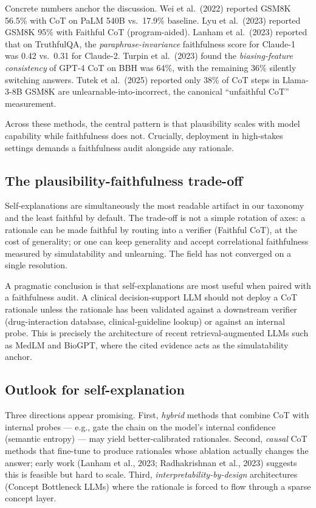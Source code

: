 Concrete numbers anchor the discussion. Wei et al.~(2022) reported GSM8K 56.5\% with CoT on PaLM 540B vs.~17.9\% baseline. Lyu et al.~(2023) reported GSM8K 95\% with Faithful CoT (program-aided). Lanham et al.~(2023) reported that on TruthfulQA, the \emph{paraphrase-invariance} faithfulness score for Claude-1 was 0.42 vs.~0.31 for Claude-2. Turpin et al.~(2023) found the \emph{biasing-feature consistency} of GPT-4 CoT on BBH was 64\%, with the remaining 36\% silently switching answers. Tutek et al.~(2025) reported only 38\% of CoT steps in Llama-3-8B GSM8K are unlearnable-into-incorrect, the canonical ``unfaithful CoT'' measurement.

Across these methods, the central pattern is that plausibility scales with model capability while faithfulness does not. Crucially, deployment in high-stakes settings demands a faithfulness audit alongside any rationale.

\subsection{The plausibility-faithfulness trade-off}\label{the-plausibility-faithfulness-trade-off}

Self-explanations are simultaneously the most readable artifact in our taxonomy and the least faithful by default. The trade-off is not a simple rotation of axes: a rationale can be made faithful by routing into a verifier (Faithful CoT), at the cost of generality; or one can keep generality and accept correlational faithfulness measured by simulatability and unlearning. The field has not converged on a single resolution.

A pragmatic conclusion is that self-explanations are most useful when paired with a faithfulness audit. A clinical decision-support LLM should not deploy a CoT rationale unless the rationale has been validated against a downstream verifier (drug-interaction database, clinical-guideline lookup) or against an internal probe. This is precisely the architecture of recent retrieval-augmented LLMs such as MedLM and BioGPT, where the cited evidence acts as the simulatability anchor.

\subsection{Outlook for self-explanation}\label{outlook-for-self-explanation}

Three directions appear promising. First, \emph{hybrid} methods that combine CoT with internal probes --- e.g., gate the chain on the model's internal confidence (semantic entropy) --- may yield better-calibrated rationales. Second, \emph{causal} CoT methods that fine-tune to produce rationales whose ablation actually changes the answer; early work (Lanham et al., 2023; Radhakrishnan et al., 2023) suggests this is feasible but hard to scale. Third, \emph{interpretability-by-design} architectures (Concept Bottleneck LLMs) where the rationale is forced to flow through a sparse concept layer.

